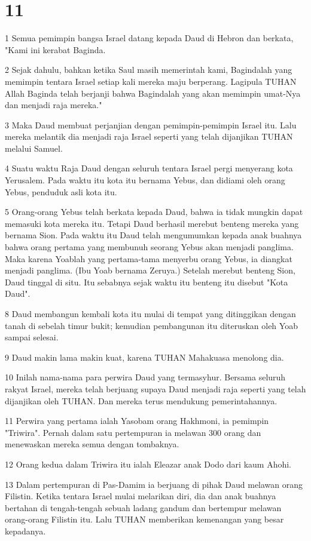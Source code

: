 \chapter{11}

\par 1 Semua pemimpin bangsa Israel datang kepada Daud di Hebron dan berkata, "Kami ini kerabat Baginda.
\par 2 Sejak dahulu, bahkan ketika Saul masih memerintah kami, Bagindalah yang memimpin tentara Israel setiap kali mereka maju berperang. Lagipula TUHAN Allah Baginda telah berjanji bahwa Bagindalah yang akan memimpin umat-Nya dan menjadi raja mereka."
\par 3 Maka Daud membuat perjanjian dengan pemimpin-pemimpin Israel itu. Lalu mereka melantik dia menjadi raja Israel seperti yang telah dijanjikan TUHAN melalui Samuel.
\par 4 Suatu waktu Raja Daud dengan seluruh tentara Israel pergi menyerang kota Yerusalem. Pada waktu itu kota itu bernama Yebus, dan didiami oleh orang Yebus, penduduk asli kota itu.
\par 5 Orang-orang Yebus telah berkata kepada Daud, bahwa ia tidak mungkin dapat memasuki kota mereka itu. Tetapi Daud berhasil merebut benteng mereka yang bernama Sion. Pada waktu itu Daud telah mengumumkan kepada anak buahnya bahwa orang pertama yang membunuh seorang Yebus akan menjadi panglima. Maka karena Yoablah yang pertama-tama menyerbu orang Yebus, ia diangkat menjadi panglima. (Ibu Yoab bernama Zeruya.) Setelah merebut benteng Sion, Daud tinggal di situ. Itu sebabnya sejak waktu itu benteng itu disebut "Kota Daud".
\par 8 Daud membangun kembali kota itu mulai di tempat yang ditinggikan dengan tanah di sebelah timur bukit; kemudian pembangunan itu diteruskan oleh Yoab sampai selesai.
\par 9 Daud makin lama makin kuat, karena TUHAN Mahakuasa menolong dia.
\par 10 Inilah nama-nama para perwira Daud yang termasyhur. Bersama seluruh rakyat Israel, mereka telah berjuang supaya Daud menjadi raja seperti yang telah dijanjikan oleh TUHAN. Dan mereka terus mendukung pemerintahannya.
\par 11 Perwira yang pertama ialah Yasobam orang Hakhmoni, ia pemimpin "Triwira". Pernah dalam satu pertempuran ia melawan 300 orang dan menewaskan mereka semua dengan tombaknya.
\par 12 Orang kedua dalam Triwira itu ialah Eleazar anak Dodo dari kaum Ahohi.
\par 13 Dalam pertempuran di Pas-Damim ia berjuang di pihak Daud melawan orang Filistin. Ketika tentara Israel mulai melarikan diri, dia dan anak buahnya bertahan di tengah-tengah sebuah ladang gandum dan bertempur melawan orang-orang Filistin itu. Lalu TUHAN memberikan kemenangan yang besar kepadanya.
